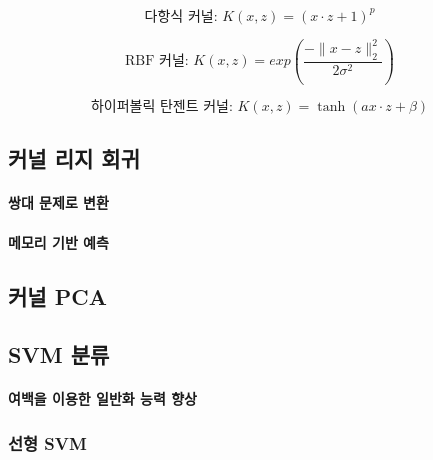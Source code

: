 \documentclass [12pt] {oblivoir}
\let\oldsubsubsection=\subsubsection
\renewcommand{\subsubsection}
{
  \filbreak
  \oldsubsubsection
}
\begin{document}
\begin{equation} \tag{11.6}
  \text{다항식 커널: } K(x, z) = (x \cdot z + 1)^{p}
\end{equation}

\begin{equation} \tag{11.7}
  \text{RBF 커널: } K(x, z) = exp\left(\frac{-\lVert x - z \rVert^{2}_{2}}{2 \sigma^{2}}\right)
\end{equation}

\begin{equation} \tag{11.8}
  \text{하이퍼볼릭 탄젠트 커널: } K(x, z) = \tanh(ax \cdot z + \beta)
\end{equation}

\vspace{3mm}

\subsection{커널 리지 회귀}

\paragraph*{쌍대 문제로 변환}\mbox{}

\vspace{3mm}

\paragraph*{메모리 기반 예측}\mbox{}

\vspace{3mm}

\subsection{커널 PCA}

\subsection{SVM 분류}

\paragraph*{여백을 이용한 일반화 능력 향상}\mbox{}

\vspace{3mm}

\subsubsection{선형 SVM}
\end{document}
